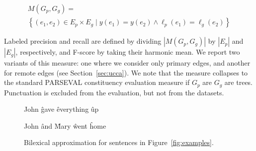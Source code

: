 \documentclass[11pt,a4paper]{article}
\newcommand{\secref}[1]{Section~\ref{#1}}
\newcommand{\figref}[1]{Figure~\ref{#1}}
\begin{document}
\vspace{-.6cm}

{\small
\begin{multline*}
    M(G_p,G_g) = \\
    \left\{(e_1,e_2) \in E_p \times E_g \;|\;
    y(e_1) = y(e_2) \wedge \ell_p(e_1)=\ell_g(e_2)\right\}
\end{multline*}
}

\vspace{-.6cm}

Labeled precision and recall are defined by dividing $|M(G_p,G_g)|$ by $|E_p|$ and $|E_g|$, respectively,
and F-score by taking their harmonic mean.
We report two variants of this measure: one where we consider only primary edges,
and another for remote edges (see \secref{sec:ucca}).
We note that the measure collapses to the standard
PARSEVAL constituency evaluation measure if $G_p$ are $G_g$ are trees.
Punctuation is excluded from the evaluation, but not from the datasets.

\begin{figure}[ht]
\centering
{}
\begin{dependency}[theme = simple]
\begin{deptext}[column sep=.7em,ampersand replacement=\^]
John \^ gave \^ everything \^ up \\
\end{deptext}
\end{dependency}
\begin{dependency}[theme = simple]
\begin{deptext}[column sep=.7em,ampersand replacement=\^]
John \^ and \^ Mary \^ went \^ home \\
\end{deptext}
\end{dependency}
\caption{Bilexical approximation for sentences in \figref{fig:examples}.}
\label{fig:bilexical_example}
\end{figure}
\end{document}
